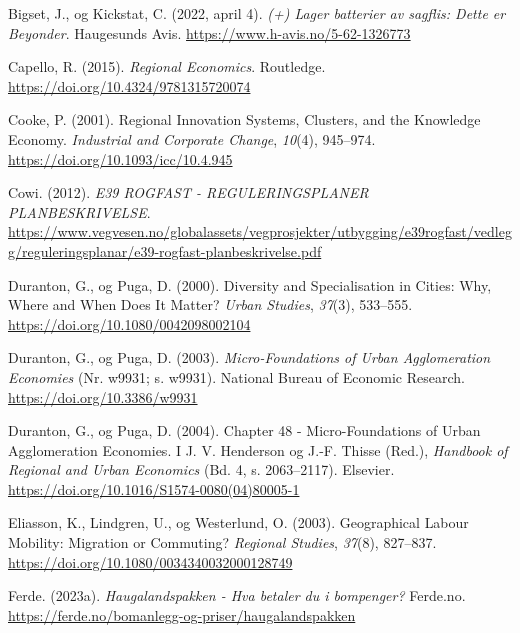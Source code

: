 \documentclass[
]{article}
\newlength{\cslhangindent}
\newlength{\cslentryspacingunit} %
\newenvironment{CSLReferences}[2] %
 {%
  \setlength{\parindent}{0pt}
  \ifodd #1
  \let\oldpar\par
  \def\par{\hangindent=\cslhangindent\oldpar}
  \fi
  \setlength{\parskip}{#2\cslentryspacingunit}
 }%
 {}
\begin{document}
\begin{CSLReferences}{1}{0}
\leavevmode{}%
Bigset, J., og Kickstat, C. (2022, april 4). \emph{(+) Lager batterier
av sagflis: Dette er Beyonder}. {Haugesunds Avis}.
\url{https://www.h-avis.no/5-62-1326773}

\leavevmode{}%
Capello, R. (2015). \emph{Regional {Economics}}. {Routledge}.
\url{https://doi.org/10.4324/9781315720074}

\leavevmode{}%
Cooke, P. (2001). Regional {Innovation Systems}, {Clusters}, and the
{Knowledge Economy}. \emph{Industrial and Corporate Change},
\emph{10}(4), 945--974. \url{https://doi.org/10.1093/icc/10.4.945}

\leavevmode{}%
Cowi. (2012). \emph{E39 ROGFAST - REGULERINGSPLANER PLANBESKRIVELSE}.
\url{https://www.vegvesen.no/globalassets/vegprosjekter/utbygging/e39rogfast/vedlegg/reguleringsplanar/e39-rogfast-planbeskrivelse.pdf}

\leavevmode{}%
Duranton, G., og Puga, D. (2000). Diversity and {Specialisation} in
{Cities}: {Why}, {Where} and {When Does} It {Matter}? \emph{Urban
Studies}, \emph{37}(3), 533--555.
\url{https://doi.org/10.1080/0042098002104}

\leavevmode{}%
Duranton, G., og Puga, D. (2003). \emph{Micro-{Foundations} of {Urban
Agglomeration Economies}} (Nr. w9931; s. w9931). {National Bureau of
Economic Research}. \url{https://doi.org/10.3386/w9931}

\leavevmode{}%
Duranton, G., og Puga, D. (2004). Chapter 48 - {Micro-Foundations} of
{Urban Agglomeration Economies}. I J. V. Henderson og J.-F. Thisse
(Red.), \emph{Handbook of {Regional} and {Urban Economics}} (Bd. 4, s.
2063--2117). {Elsevier}.
\url{https://doi.org/10.1016/S1574-0080(04)80005-1}

\leavevmode{}%
Eliasson, K., Lindgren, U., og Westerlund, O. (2003). Geographical
{Labour Mobility}: {Migration} or {Commuting}? \emph{Regional Studies},
\emph{37}(8), 827--837.
\url{https://doi.org/10.1080/0034340032000128749}

\leavevmode{}%
Ferde. (2023a). \emph{Haugalandspakken - Hva betaler du i bompenger?}
{Ferde.no}. \url{https://ferde.no/bomanlegg-og-priser/haugalandspakken}


\end{CSLReferences}
\end{document}
